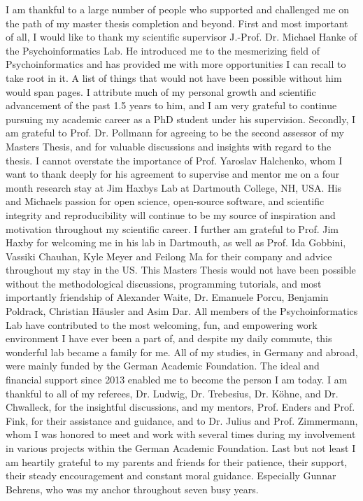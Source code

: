 \documentclass[a4paper, 11pt]{scrreprt}
\begin{document}
I am thankful to a large number of people who supported and challenged me on the path of my master thesis completion and beyond. First and most important of all, I would like to thank my scientific supervisor J.-Prof. Dr. Michael Hanke of the Psychoinformatics Lab. He introduced me to the mesmerizing field of Psychoinformatics and has provided me with more opportunities I can recall to take root in it. A list of things that would not have been possible without him would span pages. I attribute much of my personal growth and scientific advancement of the past 1.5 years to him, and I am very grateful to continue pursuing my academic career as a PhD student under his supervision. \newline
Secondly, I am grateful to Prof. Dr. Pollmann for agreeing to be the second assessor of my Masters Thesis, and for valuable discussions and insights with regard to the thesis.\newline
I cannot overstate the importance of Prof. Yaroslav Halchenko, whom I want to thank deeply for his agreement to supervise and mentor me on a four month research stay at Jim Haxbys Lab at Dartmouth College, NH, USA. His and Michaels passion for open science, open-source software, and scientific integrity and reproducibility will continue to be my source of inspiration and motivation throughout my scientific career.\newline
I further am grateful to Prof. Jim Haxby for welcoming me in his lab in Dartmouth, as well as Prof. Ida Gobbini, Vassiki Chauhan, Kyle Meyer and Feilong Ma for their company and advice throughout my stay in the US. \newline
This Masters Thesis would not have been possible without the methodological discussions, programming tutorials, and most importantly friendship of Alexander Waite, Dr. Emanuele Porcu, Benjamin Poldrack, Christian Häusler and Asim Dar. All members of the Psychoinformatics Lab have contributed to the most welcoming, fun, and empowering work environment I have ever been a part of, and despite my daily commute, this wonderful lab became a family for me. \newline
All of my studies, in Germany and abroad, were mainly funded by the German Academic Foundation. The ideal and financial support since 2013 enabled me to become the person I am today. I am thankful to all of my referees, Dr. Ludwig, Dr. Trebesius, Dr. Köhne, and Dr. Chwalleck, for the insightful discussions, and my mentors, Prof. Enders and Prof. Fink, for their assistance and guidance, and to Dr. Julius and Prof. Zimmermann, whom I was honored to meet and work with several times during my involvement in various projects within the German Academic Foundation. \newline
Last but not least I am heartily grateful to my parents and friends for their patience, their support, their steady encouragement and constant moral guidance. Especially Gunnar Behrens, who was my anchor throughout seven busy years.
\end{document}
